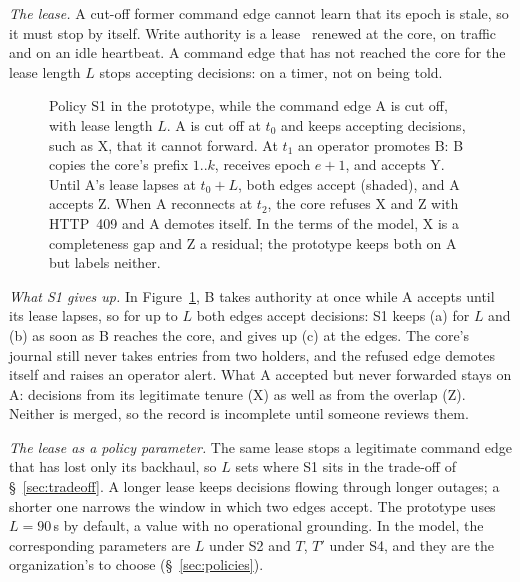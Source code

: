 \textit{The lease.} A cut-off former command edge cannot learn that its epoch is stale,
so it must stop by itself. Write authority is a lease~\cite{gray1989leases} renewed at
the core, on traffic and on an idle heartbeat. A command edge that has not reached the
core for the lease length $L$ stops accepting decisions: on a timer, not on being told.

\begin{figure}[t]
\centering

\caption{Policy S1 in the prototype, while the command edge A is cut off, with lease
length $L$. A is cut off at $t_0$ and keeps accepting decisions, such as X, that it
cannot forward. At $t_1$ an operator promotes B: B copies the core's prefix $1..k$,
receives epoch $e{+}1$, and accepts Y. Until A's lease lapses at $t_0{+}L$, both edges
accept (shaded), and A accepts Z. When A reconnects at $t_2$, the core refuses X and Z
with HTTP~409 and A demotes itself. In the terms of the model, X is a completeness gap
and Z a residual; the prototype keeps both on A but labels neither.}
\label{fig:promotion-timeline}
\end{figure}

\textit{What S1 gives up.} In Figure~\ref{fig:promotion-timeline}, B takes authority at
once while A accepts until its lease lapses, so for up to $L$ both edges accept
decisions: S1 keeps (a) for $L$ and (b) as soon as B reaches the core, and gives up (c)
at the edges. The core's journal still never takes entries from two holders, and the
refused edge demotes itself and raises an operator alert. What A accepted but never
forwarded stays on A: decisions from its legitimate tenure (X) as well as from the
overlap (Z). Neither is merged, so the record is incomplete until someone reviews them.

\textit{The lease as a policy parameter.} The same lease stops a legitimate command edge
that has lost only its backhaul, so $L$ sets where S1 sits in the trade-off of
\S~\ref{sec:tradeoff}. A longer lease keeps decisions flowing through longer outages; a
shorter one narrows the window in which two edges accept. The prototype uses $L=90$\,s by
default, a value with no operational grounding. In the model, the corresponding
parameters are $L$ under S2 and $T$, $T'$ under S4, and they are the organization's to
choose (\S~\ref{sec:policies}).
